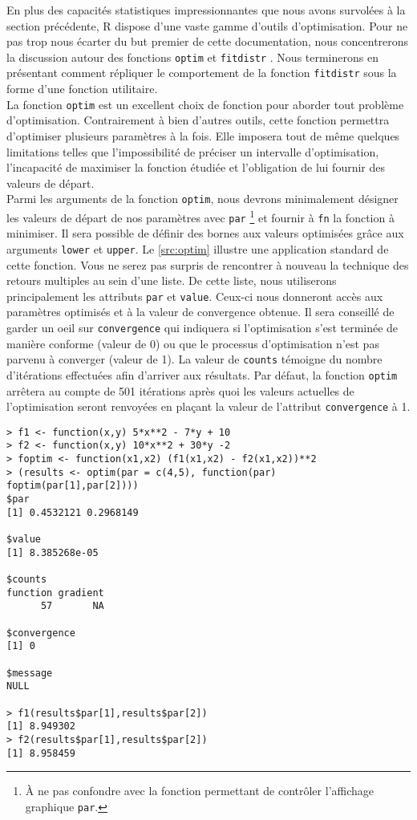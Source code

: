 En plus des capacités statistiques impressionnantes que nous avons survolées à la section précédente, R dispose d'une vaste gamme d'outils d'optimisation. Pour ne pas trop nous écarter du but premier de cette documentation, nous concentrerons la discussion autour des fonctions \texttt{optim} \cite{Rfunction:optim} et \texttt{fitdistr} \cite{Rfunction:fitdistr}. Nous terminerons en présentant comment répliquer le comportement de la fonction \texttt{fitdistr} sous la forme d'une fonction utilitaire. \\

La fonction \texttt{optim} est un excellent choix de fonction pour aborder tout problème d'optimisation. Contrairement à bien d'autres outils, cette fonction permettra d'optimiser plusieurs paramètres à la fois. Elle imposera tout de même quelques limitations telles que l'impossibilité de préciser un intervalle d'optimisation, l'incapacité de maximiser la fonction étudiée et l'obligation de lui fournir des valeurs de départ. \cite{optim} \\

Parmi les arguments de la fonction \texttt{optim}, nous devrons minimalement désigner les valeurs de départ de nos paramètres avec \texttt{par} \footnote{À ne pas confondre avec la fonction permettant de contrôler l'affichage graphique \texttt{par}.} et fournir à \texttt{fn} la fonction à minimiser. Il sera possible de définir des bornes aux valeurs optimisées grâce aux arguments \texttt{lower} et \texttt{upper}. Le \autoref{src:optim} illustre une application standard de cette fonction. Vous ne serez pas surpris de rencontrer à nouveau la technique des retours multiples au sein d'une liste. De cette liste, nous utiliserons principalement les attributs \texttt{par} et \texttt{value}. Ceux-ci nous donneront accès aux paramètres optimisés et à la valeur de convergence obtenue. Il sera conseillé de garder un oeil sur \texttt{convergence} qui indiquera si l'optimisation s'est terminée de manière conforme (valeur de 0) ou que le processus d'optimisation  n’est pas parvenu à converger (valeur de 1). La valeur de \texttt{counts} témoigne du nombre d'itérations effectuées afin d'arriver aux résultats. Par défaut, la fonction \texttt{optim} arrêtera au compte de 501 itérations après quoi les valeurs actuelles de l'optimisation seront renvoyées en plaçant la valeur de l'attribut \texttt{convergence} à 1. \\

\begin{lstlisting}[caption = Optimisation générique avec R,label=src:optim]
> f1 <- function(x,y) 5*x**2 - 7*y + 10
> f2 <- function(x,y) 10*x**2 + 30*y -2
> foptim <- function(x1,x2) (f1(x1,x2) - f2(x1,x2))**2
> (results <- optim(par = c(4,5), function(par) foptim(par[1],par[2])))
$par
[1] 0.4532121 0.2968149

$value
[1] 8.385268e-05

$counts
function gradient 
      57       NA 

$convergence
[1] 0

$message
NULL

> f1(results$par[1],results$par[2])
[1] 8.949302
> f2(results$par[1],results$par[2])
[1] 8.958459
\end{lstlisting}

